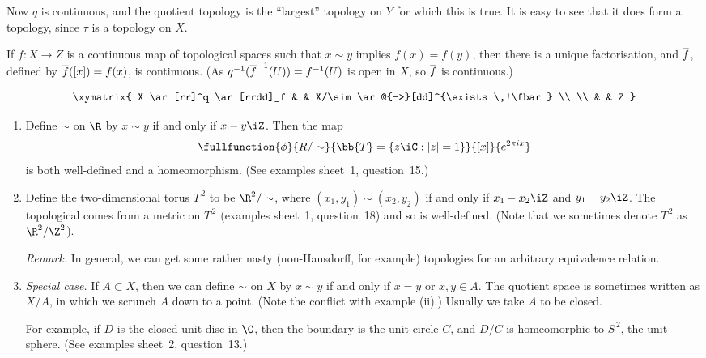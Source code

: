 \begin{remark}
	Now $q$ is continuous, and the quotient topology is the ``largest'' topology on $Y$ for which this is true. It is easy to see that it does form a topology, since $\tau$ is a topology on $X$. \label{rmk:quot-topologies}

	If $f:X\to Z$ is a continuous map of topological spaces such that $x\sim y$ implies $f(x)=f(y)$, then there is a unique factorisation, and $\overline{f}$, defined by $\overline{f}([x]) = f(x)$, is continuous. (As $q^{-1}(\overline{f}^{-1}(U)) = f^{-1}(U)$ is open in $X$, so $\overline{f}$ is continuous.)

	\begin{equation*}
		\xymatrix{
			X \ar[rr]^q \ar[rrdd]_f & & X/\sim \ar@{-->}[dd]^{\exists\,!\fbar} \\
			\\
			& & Z
		}
	\end{equation*}
\end{remark}

\begin{examples}
\mbox{}
\begin{enumerate}
	\item Define $\sim$ on $\R$ by $x\sim y$ if and only if $x-y\iZ$. Then the map
	\begin{equation*}
		\fullfunction{\phi}{R/\sim}{\bb{T} = \{z\iC: \left\vert z \right\vert=1\}}{[x]}{e^{2\pi ix}}
	\end{equation*}
	is both well-defined and a homeomorphism. (See examples sheet~1, question~15.)

	\item Define the two-dimensional torus $T^{\,2}$ to be $\R^2/\sim$, where $(x_1,y_1) \sim (x_2,y_2)$ if and only if $x_1-x_2 \iZ$ and $y_1-y_2\iZ$. The topological comes from a metric on $T^{\,2}$ (examples sheet~1, question~18) and so is well-defined. (Note that we sometimes denote $T^{\,2}$ as $\R^2/\Z^2$).

	\emph{Remark.} In general, we can get some rather nasty (non-Hausdorff, for example) topologies for an arbitrary equivalence relation.

	\item \emph{Special case.} If $A\subset X$, then we can define $\sim$ on $X$ by $x \sim y$ if and only if $x=y$ or $x,y\in A$. The quotient space is sometimes written as $X/A$, in which we scrunch $A$ down to a point. (Note the conflict with example (ii).) Usually we take $A$ to be closed.

	For example, if $D$ is the closed unit disc in $\C$, then the boundary is the unit circle $C$, and $D/C$ is homeomorphic to $S^{\,2}$, the unit sphere. (See examples sheet~2, question~13.)
\end{enumerate}
\end{examples}

